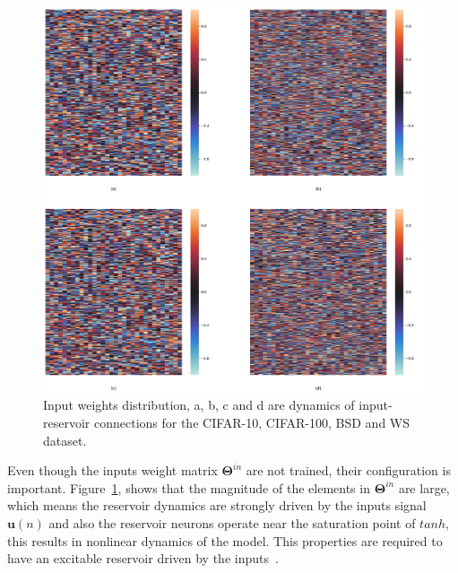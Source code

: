 \documentclass{WitsPhysicsReport}
\begin{document}
\begin{figure}[H]
\centering
  \includegraphics[width=1\textwidth]{Figure/Results/Reservoir_activity_Input_weights_activity_.png}
 \caption{Input weights distribution, a, b, c and d are dynamics of input-reservoir connections for the CIFAR-10, CIFAR-100, BSD and WS dataset.}
 \label{fig:input_activity}
\end{figure}

Even though the inputs weight matrix ${\mathbf{\Theta}}^{in}$ are not trained, their configuration is important. Figure~\ref{fig:input_activity}, shows that the magnitude of the elements in ${\mathbf{\Theta}}^{in}$ are large, which means the reservoir dynamics are strongly driven by the inputs signal $\mathbf{u}(n)$ and also the reservoir neurons operate near the saturation point of $tanh$, this results in nonlinear dynamics of the model. This properties are required to have an excitable reservoir driven by the inputs~\cite{jaeger2007optimization}.
\end{document}
